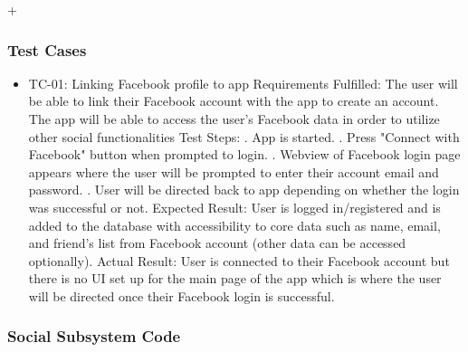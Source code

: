 \documentclass{article}
\begin{document}
+\subsubsection{Test Cases}
\begin{itemize}
  \item TC-01: Linking Facebook profile to app
  \subitem Requirements Fulfilled:
  \subsubitem The user will be able to link their Facebook account with the app to create
  an account.
  \subsubitem The app will be able to access the user's Facebook data in order to utilize other social functionalities
  \subitem Test Steps:
  . App is started.
  . Press "Connect with Facebook" button when prompted to login.
  . Webview of Facebook login page appears where the user will be prompted to enter their account email and password.
  . User will be directed back to app depending on whether the login was successful or not.
  \subitem Expected Result: User is logged in/registered and is added to the database with accessibility to core data such as name, email, and friend's list from Facebook account (other data can be accessed optionally).
  \subitem Actual Result: User is connected to their Facebook account but there is no UI set up for the main page of the app which is where the user will be directed once their Facebook login is successful.
\end{itemize}
\pagebreak

\subsubsection{Social Subsystem Code}
\end{document}
